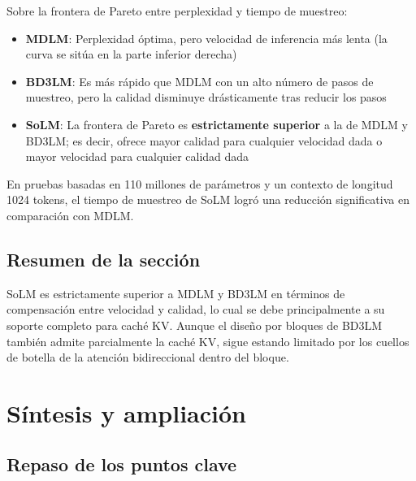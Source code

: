 \documentclass[a4paper]{article}
\begin{document}
Sobre la frontera de Pareto entre perplexidad y tiempo de muestreo:

\begin{itemize}
    \item \textbf{MDLM}: Perplexidad óptima, pero velocidad de inferencia más lenta (la curva se sitúa en la parte inferior derecha)
    \item \textbf{BD3LM}: Es más rápido que MDLM con un alto número de pasos de muestreo, pero la calidad disminuye drásticamente tras reducir los pasos
    \item \textbf{SoLM}: La frontera de Pareto es \textbf{estrictamente superior} a la de MDLM y BD3LM; es decir, ofrece mayor calidad para cualquier velocidad dada o mayor velocidad para cualquier calidad dada
\end{itemize}

En pruebas basadas en 110 millones de parámetros y un contexto de longitud 1024 tokens, el tiempo de muestreo de SoLM logró una reducción significativa en comparación con MDLM.

\subsection{Resumen de la sección}

SoLM es estrictamente superior a MDLM y BD3LM en términos de compensación entre velocidad y calidad, lo cual se debe principalmente a su soporte completo para caché KV. Aunque el diseño por bloques de BD3LM también admite parcialmente la caché KV, sigue estando limitado por los cuellos de botella de la atención bidireccional dentro del bloque.

\newpage

\section{Síntesis y ampliación}

\subsection{Repaso de los puntos clave}
\end{document}
